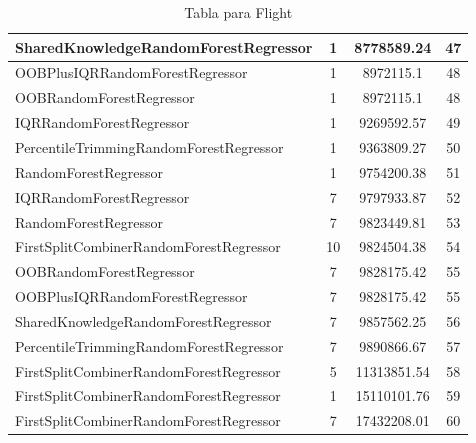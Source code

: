 \begin{table}[h]
\begin{tabular}{|l|c|c|c|}
\textcolor[HTML]{ef9b20}{SharedKnowledgeRandomForestRegressor} & 1 & 8778589.24 & 47 \\ \hline
\textcolor[HTML]{ede15b}{OOBPlusIQRRandomForestRegressor} & 1 & 8972115.1 & 48 \\ \hline
\textcolor[HTML]{b33dc6}{OOBRandomForestRegressor} & 1 & 8972115.1 & 48 \\ \hline
\textcolor[HTML]{27aeef}{IQRRandomForestRegressor} & 1 & 9269592.57 & 49 \\ \hline
\textcolor[HTML]{f46a9b}{PercentileTrimmingRandomForestRegressor} & 1 & 9363809.27 & 50 \\ \hline
\textcolor[HTML]{87bc45}{RandomForestRegressor} & 1 & 9754200.38 & 51 \\ \hline
\textcolor[HTML]{27aeef}{IQRRandomForestRegressor} & 7 & 9797933.87 & 52 \\ \hline
\textcolor[HTML]{87bc45}{RandomForestRegressor} & 7 & 9823449.81 & 53 \\ \hline
\textcolor[HTML]{ea5545}{FirstSplitCombinerRandomForestRegressor} & 10 & 9824504.38 & 54 \\ \hline
\textcolor[HTML]{b33dc6}{OOBRandomForestRegressor} & 7 & 9828175.42 & 55 \\ \hline
\textcolor[HTML]{ede15b}{OOBPlusIQRRandomForestRegressor} & 7 & 9828175.42 & 55 \\ \hline
\textcolor[HTML]{ef9b20}{SharedKnowledgeRandomForestRegressor} & 7 & 9857562.25 & 56 \\ \hline
\textcolor[HTML]{f46a9b}{PercentileTrimmingRandomForestRegressor} & 7 & 9890866.67 & 57 \\ \hline
\textcolor[HTML]{ea5545}{FirstSplitCombinerRandomForestRegressor} & 5 & 11313851.54 & 58 \\ \hline
\textcolor[HTML]{ea5545}{FirstSplitCombinerRandomForestRegressor} & 1 & 15110101.76 & 59 \\ \hline
\textcolor[HTML]{ea5545}{FirstSplitCombinerRandomForestRegressor} & 7 & 17432208.01 & 60 \\ \hline
\end{tabular}
\caption{Tabla para Flight}
\end{table}


